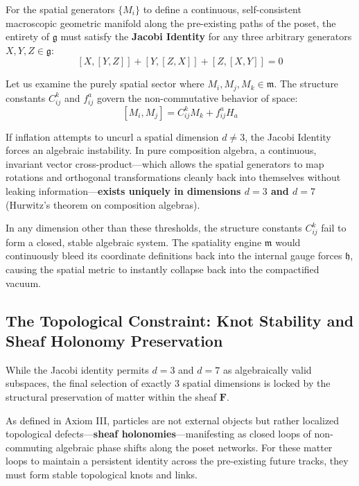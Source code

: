 \documentclass[12pt,letterpaper]{article}
\begin{document}
For the spatial generators $\{M_i\}$ to define a continuous, self-consistent macroscopic geometric manifold along the pre-existing paths of the poset, the entirety of $\mathfrak{g}$ must satisfy the \textbf{Jacobi Identity} for any three arbitrary generators $X, Y, Z \in \mathfrak{g}$:
$$[X, [Y, Z]] + [Y, [Z, X]] + [Z, [X, Y]] = 0$$

Let us examine the purely spatial sector where $M_i, M_j, M_k \in \mathfrak{m}$. The structure constants $C_{ij}^k$ and $f_{ij}^a$ govern the non-commutative behavior of space:
$$[M_i, M_j] = C_{ij}^k M_k + f_{ij}^a H_a$$

If inflation attempts to uncurl a spatial dimension $d \neq 3$, the Jacobi Identity forces an algebraic instability. In pure composition algebra, a continuous, invariant vector cross-product---which allows the spatial generators to map rotations and orthogonal transformations cleanly back into themselves without leaking information---\textbf{exists uniquely in dimensions $d=3$ and $d=7$} (Hurwitz's theorem on composition algebras).

In any dimension other than these thresholds, the structure constants $C_{ij}^k$ fail to form a closed, stable algebraic system. The spatiality engine $\mathfrak{m}$ would continuously bleed its coordinate definitions back into the internal gauge forces $\mathfrak{h}$, causing the spatial metric to instantly collapse back into the compactified vacuum.

\subsection{The Topological Constraint: Knot Stability and Sheaf Holonomy Preservation}
While the Jacobi identity permits $d=3$ and $d=7$ as algebraically valid subspaces, the final selection of exactly 3 spatial dimensions is locked by the structural preservation of matter within the sheaf $\mathbf{F}$.

As defined in Axiom III, particles are not external objects but rather localized topological defects---\textbf{sheaf holonomies}---manifesting as closed loops of non-commuting algebraic phase shifts along the poset networks. For these matter loops to maintain a persistent identity across the pre-existing future tracks, they must form stable topological knots and links.
\end{document}
